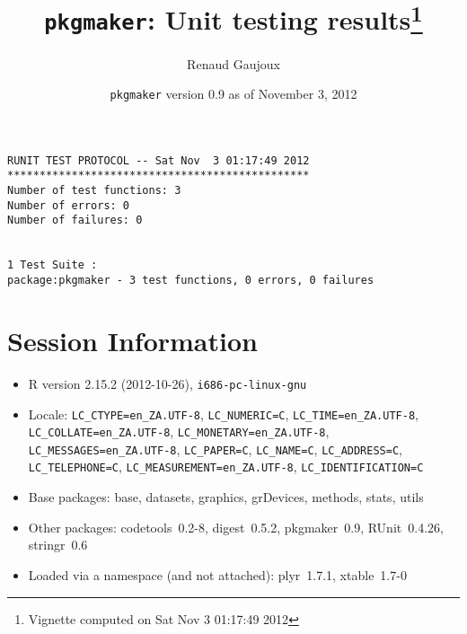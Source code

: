 \documentclass[10pt]{article}
\author{Renaud Gaujoux}
\title{\texttt{pkgmaker}: Unit testing results\footnote{Vignette computed  on Sat Nov  3 01:17:49 2012}}
\date{\texttt{pkgmaker} version 0.9 as of November  3, 2012}
\begin{document}
\maketitle

\begin{verbatim}
RUNIT TEST PROTOCOL -- Sat Nov  3 01:17:49 2012 
*********************************************** 
Number of test functions: 3 
Number of errors: 0 
Number of failures: 0 

 
1 Test Suite : 
package:pkgmaker - 3 test functions, 0 errors, 0 failures
\end{verbatim}

\section*{Session Information}
\begin{itemize}\raggedright
  \item R version 2.15.2 (2012-10-26), \verb|i686-pc-linux-gnu|
  \item Locale: \verb|LC_CTYPE=en_ZA.UTF-8|, \verb|LC_NUMERIC=C|, \verb|LC_TIME=en_ZA.UTF-8|, \verb|LC_COLLATE=en_ZA.UTF-8|, \verb|LC_MONETARY=en_ZA.UTF-8|, \verb|LC_MESSAGES=en_ZA.UTF-8|, \verb|LC_PAPER=C|, \verb|LC_NAME=C|, \verb|LC_ADDRESS=C|, \verb|LC_TELEPHONE=C|, \verb|LC_MEASUREMENT=en_ZA.UTF-8|, \verb|LC_IDENTIFICATION=C|
  \item Base packages: base, datasets, graphics, grDevices, methods,
    stats, utils
  \item Other packages: codetools~0.2-8, digest~0.5.2, pkgmaker~0.9,
    RUnit~0.4.26, stringr~0.6
  \item Loaded via a namespace (and not attached): plyr~1.7.1,
    xtable~1.7-0
\end{itemize}
\end{document}
